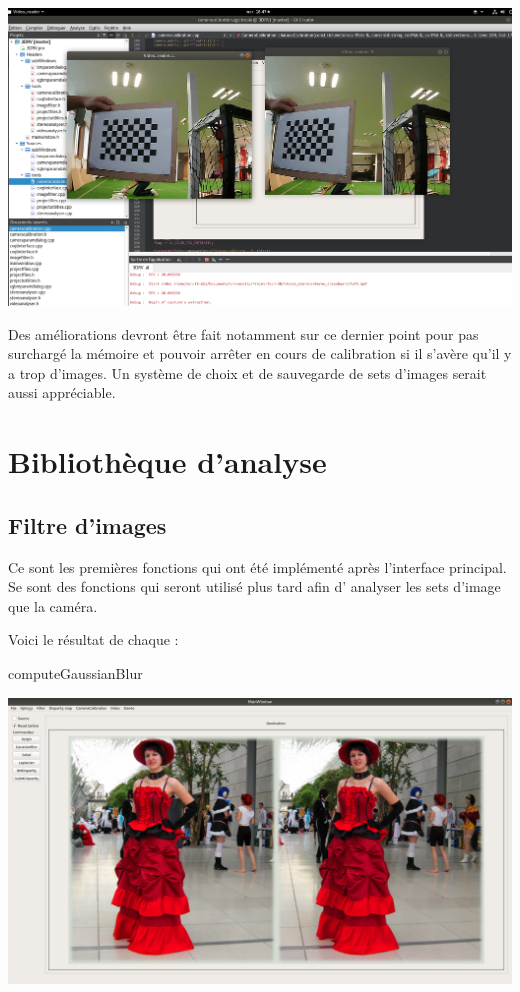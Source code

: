 \documentclass{article}
\begin{document}
\includegraphics[width=\linewidth]{img/video.png}

Des améliorations devront être fait notamment sur ce dernier point pour pas surchargé la mémoire et pouvoir arrêter en cours de calibration si il s’avère qu'il y a trop d'images.
Un système de choix et de sauvegarde de sets d'images serait aussi appréciable. 

\newpage
\section{Bibliothèque d'analyse}
\par\leavevmode\par
\subsection{Filtre d'images}


Ce sont les premières fonctions qui ont été implémenté après l'interface principal. Se sont des fonctions qui seront utilisé plus tard  afin d' analyser les sets d'image que la caméra.

Voici le résultat de chaque :

computeGaussianBlur

\includegraphics[width=\linewidth]{img/blur.png}
\end{document}
